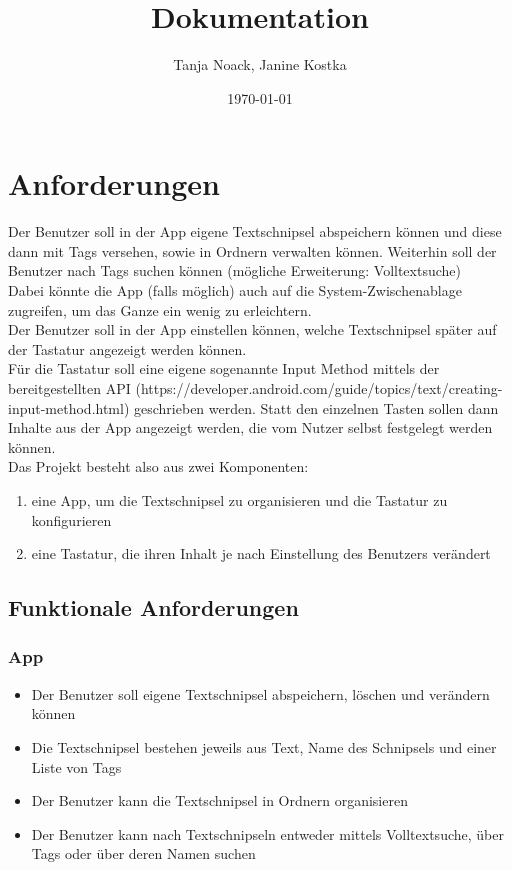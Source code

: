 \documentclass[11pt]{article}
\title{Dokumentation}
\author{Tanja Noack, Janine Kostka}
\date{\today}
\begin{document}
\maketitle  
\pagebreak


\tableofcontents
\pagebreak


\section{Anforderungen}
	Der Benutzer soll in der App eigene Textschnipsel abspeichern können und diese dann mit Tags versehen, sowie in Ordnern verwalten können. Weiterhin soll der Benutzer nach Tags suchen können (mögliche Erweiterung: Volltextsuche) \\
	Dabei könnte die App (falls möglich) auch auf die System-Zwischenablage zugreifen, um das Ganze ein wenig zu erleichtern. \\
	Der Benutzer soll in der App einstellen können, welche Textschnipsel später auf der Tastatur angezeigt werden können. \\
	
	Für die Tastatur soll eine eigene sogenannte Input Method mittels der bereitgestellten API (https://developer.android.com/guide/topics/text/creating-input-method.html) geschrieben werden. Statt den einzelnen Tasten sollen dann Inhalte aus der App angezeigt werden, die vom Nutzer selbst festgelegt werden können.\\

	Das Projekt besteht also aus zwei Komponenten:
	\begin{enumerate}
		\item eine App, um die Textschnipsel zu organisieren und die Tastatur zu konfigurieren
		\item eine Tastatur, die ihren Inhalt je nach Einstellung des Benutzers verändert
	\end{enumerate}

	\subsection{Funktionale Anforderungen}
		\subsubsection{App}
		\begin{itemize}
			\item Der Benutzer soll eigene Textschnipsel abspeichern, löschen und verändern können
			\item Die Textschnipsel bestehen jeweils aus Text, Name des Schnipsels und einer Liste von Tags
			\item Der Benutzer kann die Textschnipsel in Ordnern organisieren
			\item Der Benutzer kann nach Textschnipseln entweder mittels Volltextsuche, über Tags oder über deren Namen suchen
		\end{itemize}
	
\end{document}
